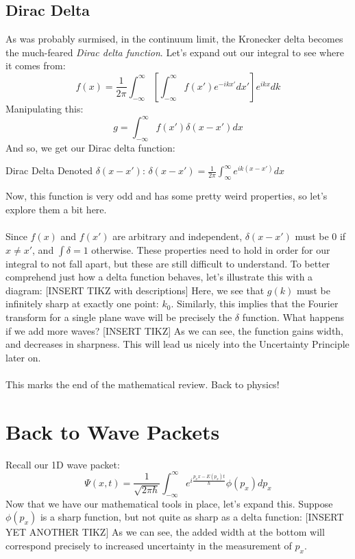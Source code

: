       \subsection{Dirac Delta}
        As was probably surmised, in the continuum limit, the Kronecker delta becomes the much-feared \textit{Dirac delta function}. Let's expand out our integral to see where it comes from:
        $$f(x) = \frac{1}{2\pi}\int_{-\infty}^{\infty}\left[\int_{-\infty}^{\infty}f(x')e^{-ikx'}dx'\right]e^{ikx}dk$$
        Manipulating this:
        $$g = \int_{-\infty}^{\infty}f(x')\delta(x-x')dx$$
        And so, we get our Dirac delta function:
        \begin{definition}{Dirac Delta}{}
          Denoted $\delta(x-x')$: $\delta(x-x') = \frac{1}{2\pi}\int_{\infty}^{\infty}e^{ik(x-x')}dx$
        \end{definition}
        Now, this function is very odd and has some pretty weird properties, so let's explore them a bit here.\\\\
        Since $f(x)$ and $f(x')$ are arbitrary and independent, $\delta(x-x')$ must be $0$ if $x\neq x'$, and $\int \delta = 1$ otherwise. These properties need to hold in order for our integral to not fall apart, but these are still difficult to understand. To better comprehend just how a delta function behaves, let's illustrate this with a diagram:
          [INSERT TIKZ with descriptions]
        Here, we see that $g(k)$ must be infinitely sharp at exactly one point: $k_0$. Similarly, this implies that the Fourier transform for a single plane wave will be precisely the $\delta$ function. What happens if we add more waves?
          [INSERT TIKZ]
        As we can see, the function gains width, and decreases in sharpness. This will lead us nicely into the Uncertainty Principle later on.\\\\
        This marks the end of the mathematical review. Back to physics!

    \section{Back to Wave Packets}
      Recall our 1D wave packet: $$\Psi(x,t) = \frac{1}{\sqrt{2\pi\hbar}}\int_{-\infty}^{\infty}e^{i\frac{p_xx - E(p_x)t}{\hbar}}\phi(p_x)dp_x$$
      Now that we have our mathematical tools in place, let's expand this. Suppose $\phi(p_x)$ is a sharp function, but not quite as sharp as a delta function:
        [INSERT YET ANOTHER TIKZ]
      As we can see, the added width at the bottom will correspond precisely to increased uncertainty in the measurement of $p_x$.

